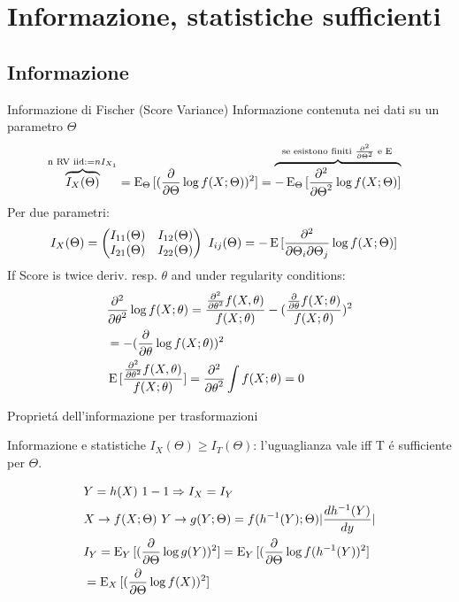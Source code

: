 \documentclass[asd-beamer.tex]{subfiles}
\begin{document}
\section{Informazione, statistiche sufficienti}

\subsection{Informazione}

\begin{frame}{Informazione di Fischer (Score Variance)}\frameintoc
Informazione contenuta nei dati su un parametro $\Theta$
\begin{align*}
&\overbrace{I_X(\Theta)}^{\text{n RV iid:}=nI_{X_1}}=\E_{\Theta}{[(\PDof{\Theta}\log{f(X;\Theta}))^2]}=\overbrace{-\E_{\Theta}{[\PtwoDof{\Theta}\log{f(X;\Theta)}]}}^{\text{se esistono finiti $\PtwoDof{\Theta}$ e $\E{}$}}
\end{align*}
Per due parametri:
\begin{align*}
&I_X(\Theta)=\begin{pmatrix}I_{11}(\Theta)&I_{12}(\Theta)\\I_{21}(\Theta)&I_{22}(\Theta)\end{pmatrix}\ I_{ij}(\Theta)=-\E{[\frac{\partial^2}{\partial\Theta_i\partial\Theta_j}\log{f(X;\Theta)}]}
\end{align*}
If Score is twice deriv. resp. $\theta$ and under regularity conditions:
\begin{align*}
&\PtwoDof{\theta}\log{f(X;\theta)}=\frac{\PtwoDof{\theta}f(X,\theta)}{f(X;\theta)}-(\frac{\PDof{\theta}f(X;\theta)}{f(X;\theta)})^2\\
&=-(\PDof{\theta}\log{f(X;\theta)})^2\\
&\E{[\frac{\PtwoDof{\theta}f(X,\theta)}{f(X;\theta)}]}=\PtwoDof{\theta}\int f(X;\theta)=0
\end{align*}
\end{frame}

\begin{frame}{Propriet\'a dell'informazione per trasformazioni}
\begin{block}{Informazione e statistiche}
$I_X(\Theta)\geq I_T(\Theta)$: l'uguaglianza vale iff T \'e sufficiente per $\Theta$.
\end{block}
\begin{align*}
&Y=h(X)\ 1-1 \Rightarrow I_X=I_Y\\
&X\to f(X;\Theta)\ Y\to g(Y;\Theta)=f(\invers{h}(Y);\Theta)|\TDy{y}{\invers{h}(Y)}|\\
&I_Y=\E_Y{[(\PDof{\Theta}\log{g(Y)})^2]}=\E_Y{[(\PDof{\Theta}\log{f(\invers{h}(Y)})^2]}\\
&=\E_X{[(\PDof{\Theta}\log{f(X)})^2]}
\end{align*}
\end{frame}
\end{document}
